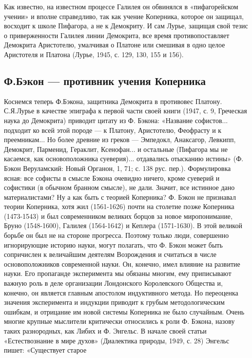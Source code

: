 Как известно, на известном процессе Галилея он обвинялся в
«пифагорейском учении» и вполне справедливо, так как учение Коперника,
которое он защищал, восходит к школе Пифагора, а не к Демокриту. И сам
Лурье, защищая свой тезис о приверженности Галилея линии Демокрита,
все время противопоставляет Демокрита Аристотелю, умалчивая о Платоне
или смешивая в одно целое Аристотеля и Платона (Лурье, 1945, с. 129,
130, 155 и 156).

\subsection{Ф.Бэкон --- противник учения Коперника}

Коснемся теперь Ф.Бэкона, защитника Демокрита в противовес
Платону. С.Я.Лурье в качестве эпиграфа к первой части своей книги
(1947, с. 9, Греческая наука до Демокрита) приводит цитату из Ф.
Бэкона: «Название софистов... подходит ко всей этой породе --- к
Платону, Аристотелю, Феофрасту и к преемникам... Но более древние из
греков --- Эмпедокл, Анаксагор, Левкипп, Демокрит, Парменид, Гераклит,
Ксенофан... и остальные (Пифагора мы не касаемся, как основоположника
суеверия)... отдавались отысканию истины» (Ф. Бэкон Веруламский: Новый
Органон, 1, 71; с. 138 рус. пер.). Формулировка ясная: все софисты в
смысле Бэкона очевидно ничего, кроме суеверий и софистики (в обычном
бранном смысле), не дали. Значит, все истинное дано материалистами? Ну
а как быть с теорией Коперника? Ф. Бэкон не признавал теории
Коперника, хотя жил (1561-1626) почти на столетие позже Коперника
(1473-1543) и был современником великих борцов за новое миропонимание,
Бруно (1548-1600), Галилея (1564-1642) и Кеплера (1571-1630). В этой
великой борьбе он был не на стороне прогресса. Поэтому только люди,
совершенно игнорирующие историю науки, могут полагать, что Ф. Бэкон
может быть сопричислен к величайшим деятелям Возрождения и считаться в
числе основоположников современной науки. Он, конечно, имел влияние на
развитие науки. Его пропаганде эксперимента мы обязаны многим, ему
приписывают важную роль в деле организации Лондонского Королевского
Общества и, конечно, он является главным апостолом индуктивного
метода. Но переоценка значения эксперимента и индукции приводит к
грубым методологическим ошибкам, и отрицание им новой системы
Коперника не было случайным. Очень многие крупные мыслители критически
относились к роли Ф. Бэкона, назову таких разнородных, как Либих и Ф.
Энгельс. В начале своей статьи «Естествознание в мире духов»
(Диалектика природы, 1949, с. 28) Энгельс пишет: «Существует старое
